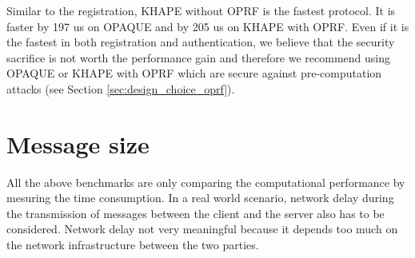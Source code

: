 \documentclass[../report.tex]{subfiles}
\begin{document}
Similar to the registration, KHAPE without OPRF is the fastest protocol. It is faster by 197 us on OPAQUE and by 205 us on KHAPE with OPRF.
Even if it is the fastest in both registration and authentication, we believe that the security sacrifice is not worth the performance gain and therefore we recommend using OPAQUE or KHAPE with OPRF which are secure against pre-computation attacks (see Section \ref{sec:design_choice_oprf}).







\section{Message size} \label{sec:comp_message_size}

All the above benchmarks are only comparing the computational performance by mesuring the time consumption. In a real world scenario, network delay during the transmission of messages between the client and the server also has to be considered. Network delay not very meaningful because it depends too much on the network infrastructure between the two parties.
\end{document}
